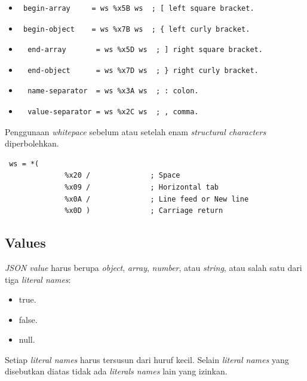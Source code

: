 \begin{itemize}
	\item \begin{verbatim} begin-array     = ws %x5B ws  ; [ left square bracket. 
	\end{verbatim}
	\item \begin{verbatim} begin-object    = ws %x7B ws  ; { left curly bracket. 
	\end{verbatim}
	\item \begin{verbatim}  end-array       = ws %x5D ws  ; ] right square bracket. 
	\end{verbatim}
	\item \begin{verbatim}  end-object      = ws %x7D ws  ; } right curly bracket. 
	\end{verbatim}
	\item \begin{verbatim}  name-separator  = ws %x3A ws  ; : colon.
	\end{verbatim}
	\item \begin{verbatim}  value-separator = ws %x2C ws  ; , comma.
	\end{verbatim}
\end{itemize}
Penggunaan \textit{whitepace} sebelum atau setelah enam \textit{structural characters} diperbolehkan.
\begin{verbatim} 
 ws = *(
              %x20 /              ; Space
              %x09 /              ; Horizontal tab
              %x0A /              ; Line feed or New line
              %x0D )              ; Carriage return
\end{verbatim}
    
\subsection{Values}
\textit{JSON value} harus berupa \textit{object}, \textit{array}, \textit{number}, atau \textit{string}, atau salah satu dari tiga \textit{literal names}:
\begin{itemize}
	\item true.
	\item false.
	\item null.
\end{itemize}
Setiap \textit{literal names} harus tersusun dari huruf kecil. Selain  \textit{literal names} yang disebutkan diatas tidak ada \textit{literals names} lain yang izinkan.

